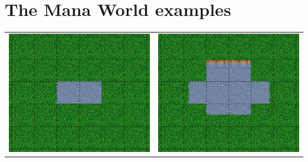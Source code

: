 \newpage
\section{The Mana World examples}
\begin{table}
        \begin{tabular}{c c}
        \includegraphics[scale=1]{Example/TheManaWorld/flow1.eps} &
        \includegraphics[scale=1]{Example/TheManaWorld/flow2.eps} \\

\end{tabular}
\end{table}
